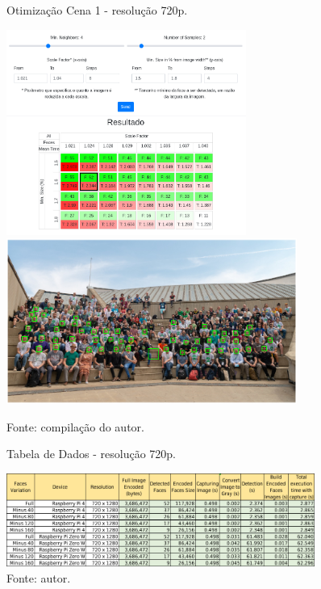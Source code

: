 \begin{figure}[H]
    \centering
    \caption[Otimização Cena 1 - resolução 720p.]{Otimização Cena 1 - resolução 720p.}
    \includegraphics[width=0.70\textwidth]{Cap4_Experimentos_Realizados/Figures/cena1_param_720p_matriz.jpg}
    \includegraphics[width=0.85\textwidth]{Cap4_Experimentos_Realizados/Figures/cena1_param_720p_faces.jpg}
    \caption*{Fonte: compilação do autor.\footnotemark[\value{footnote}]}
    \label{fig:otimizacaoCena1_720p}
\end{figure}

\begin{figure}
    \centering
    \caption[Tabela de Dados - resolução 720p.]{Tabela de Dados - resolução 720p.}
    \includegraphics[width=0.90\textwidth]{Cap4_Experimentos_Realizados/Figures/cena1_dados_720p.jpg}
    \caption*{Fonte: autor.}
    \label{fig:dadosCena1_720p}
\end{figure}

